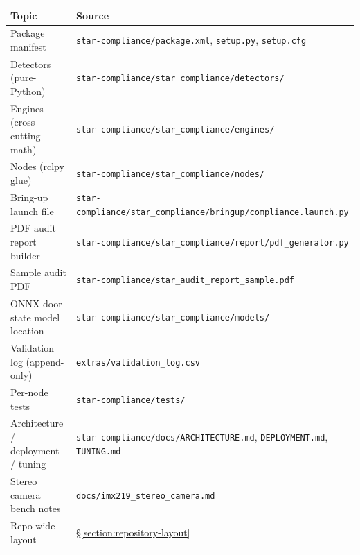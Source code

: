 \begin{center}
\begin{tabular}{|p{5.0cm}|p{9.0cm}|}
\hline
\textbf{Topic} & \textbf{Source} \\
\hline
Package manifest                       & \texttt{star-compliance/package.xml}, \texttt{setup.py}, \texttt{setup.cfg} \\
Detectors (pure-Python)                & \texttt{star-compliance/star\_compliance/detectors/} \\
Engines (cross-cutting math)           & \texttt{star-compliance/star\_compliance/engines/} \\
Nodes (rclpy glue)                     & \texttt{star-compliance/star\_compliance/nodes/} \\
Bring-up launch file                   & \texttt{star-compliance/star\_compliance/bringup/compliance.launch.py} \\
PDF audit report builder               & \texttt{star-compliance/star\_compliance/report/pdf\_generator.py} \\
Sample audit PDF                       & \texttt{star-compliance/star\_audit\_report\_sample.pdf} \\
ONNX door-state model location         & \texttt{star-compliance/star\_compliance/models/} \\
Validation log (append-only)           & \texttt{extras/validation\_log.csv} \\
Per-node tests                         & \texttt{star-compliance/tests/} \\
Architecture / deployment / tuning     & \texttt{star-compliance/docs/ARCHITECTURE.md}, \texttt{DEPLOYMENT.md}, \texttt{TUNING.md} \\
Stereo camera bench notes              & \texttt{docs/imx219\_stereo\_camera.md} \\
Repo-wide layout                       & \S\ref{section:repository-layout} \\
\hline
\end{tabular}
\end{center}
